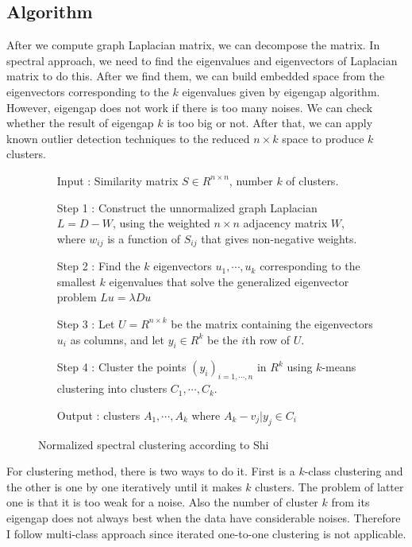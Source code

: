 \subsection{Algorithm}
After we compute graph Laplacian matrix, we can decompose the matrix. 
In spectral approach, we need to find the eigenvalues and eigenvectors of Laplacian matrix to do this. 
After we find them, we can build embedded space from the eigenvectors corresponding to the $k$ eigenvalues given by eigengap algorithm. 
However, eigengap does not work if there is too many noises. 
We can check whether the result of eigengap $k$ is too big or not.
After that, we can apply known outlier detection techniques \cite{knorr00} to the reduced $n \times k$ space to produce $k$ clusters. 
\begin{figure}[ht]
\begin{mdframed}
\begin{enumerate}
\item[Input] : Similarity matrix $S \in R^{n \times n}$, number $k$ of clusters. \\
\item[Step 1] : Construct the unnormalized graph Laplacian $L = D - W$, using the weighted $n \times n$ adjacency matrix $W$, where $w_{ij}$ is a function of $S_{ij}$ that gives non-negative weights. \\
\item[Step 2] : Find the $k$ eigenvectors $u_1, \cdots, u_k$ corresponding to the smallest $k$ eigenvalues that solve the generalized eigenvector problem $L u = \lambda D u$ \\
\item[Step 3] : Let $U = R^{n \times k}$ be the matrix containing the eigenvectors $u_i$ as columns, and let $y_i \in R^k$ be the $i$th row of $U$.\\
\item[Step 4] : Cluster the points $(y_i)_{i=1,\cdots,n}$ in $R^k$ using $k$-means clustering into clusters $C_1,\cdots,C_k$.\\
\item[Output] : clusters $A_1, \cdots, A_k$ where $A_k - {v_j|y_j \in C_i}$
\end{enumerate}
\end{mdframed}
\caption{Normalized spectral clustering according to Shi}
\end{figure}


For clustering method, there is two ways to do it. 
First is a $k$-class clustering \cite{jianbo03} and the other is one by one iteratively until it makes $k$ clusters. 
The problem of latter one is that it is too weak for a noise. 
Also the number of cluster $k$ from its eigengap does not always best when the data have considerable noises. 
Therefore I follow multi-class approach since iterated one-to-one clustering is not applicable. %
